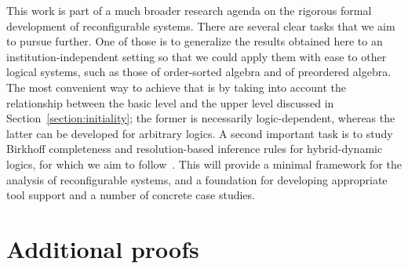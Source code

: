 \documentclass[a4paper,UKenglish,cleveref, autoref]{lipics-v2019}
\begin{document}
This work is part of a much broader research agenda on the rigorous formal development of reconfigurable systems.
There are several clear tasks that we aim to pursue further.
One of those is to generalize the results obtained here to an institution-independent setting so that we could apply them with ease to other logical systems, such as those of order-sorted algebra and of preordered algebra.
The most convenient way to achieve that is by taking into account the relationship between the basic level and the upper level discussed in Section~\ref{section:initiality}; the former is necessarily logic-dependent, whereas the latter can be developed for arbitrary logics.
A second important task is to study Birkhoff completeness and resolution-based inference rules for hybrid-dynamic logics, for which we aim to follow~\cite{Gaina17Bir,TutuF17}.
This will provide a minimal framework for the analysis of reconfigurable systems, and a foundation for developing appropriate tool support and a number of concrete case studies.





\appendix

\section{Additional proofs}
\end{document}
